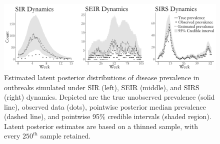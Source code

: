\begin{figure}[!h]
	\centering
	\includegraphics[width=\linewidth]{figures/sim1_latent_posts.pdf}
	\caption[Estimated latent posteriors for SIR, SEIR, and SIRS models fit to simulated prevalence data.]{Estimated latent posterior distributions of disease prevalence in outbreaks simulated under SIR (left), SEIR (middle), and SIRS (right) dynamics. Depicted are the true unobserved prevalence (solid line), observed data (dots), pointwise posterior median prevalence (dashed line), and pointwise 95\% credible intervals (shaded region). Latent posterior estimates are based on a thinned sample, with every $250^{th}$ sample retained.}
	\label{fig:sim1_latent_posts}
\end{figure}

